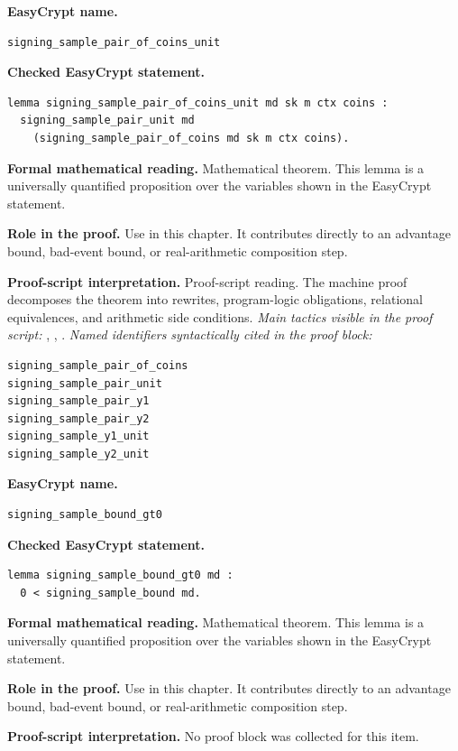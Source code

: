 \begin{formaltheorem}
\noindent\textbf{EasyCrypt name.}
\begin{lstlisting}[language=EasyCrypt,basicstyle=\ttfamily\scriptsize]
signing_sample_pair_of_coins_unit
\end{lstlisting}
\noindent\textbf{Checked EasyCrypt statement.}
\begin{lstlisting}[language=EasyCrypt,basicstyle=\ttfamily\scriptsize]
lemma signing_sample_pair_of_coins_unit md sk m ctx coins :
  signing_sample_pair_unit md
    (signing_sample_pair_of_coins md sk m ctx coins).
\end{lstlisting}
\noindent\textbf{Formal mathematical reading.}
Mathematical theorem. This lemma is a universally quantified proposition over the variables shown in the EasyCrypt statement.

\noindent\textbf{Role in the proof.}
Use in this chapter. It contributes directly to an advantage bound, bad-event bound, or real-arithmetic composition step.

\noindent\textbf{Proof-script interpretation.}
Proof-script reading. The machine proof decomposes the theorem into rewrites, program-logic obligations, relational equivalences, and arithmetic side conditions.
\emph{Main tactics visible in the proof script:} , , .
\emph{Named identifiers syntactically cited in the proof block:}
\begin{lstlisting}[language=EasyCrypt,basicstyle=\ttfamily\scriptsize]
signing_sample_pair_of_coins
signing_sample_pair_unit
signing_sample_pair_y1
signing_sample_pair_y2
signing_sample_y1_unit
signing_sample_y2_unit
\end{lstlisting}

\end{formaltheorem}

\begin{formaltheorem}
\noindent\textbf{EasyCrypt name.}
\begin{lstlisting}[language=EasyCrypt,basicstyle=\ttfamily\scriptsize]
signing_sample_bound_gt0
\end{lstlisting}
\noindent\textbf{Checked EasyCrypt statement.}
\begin{lstlisting}[language=EasyCrypt,basicstyle=\ttfamily\scriptsize]
lemma signing_sample_bound_gt0 md :
  0 < signing_sample_bound md.
\end{lstlisting}
\noindent\textbf{Formal mathematical reading.}
Mathematical theorem. This lemma is a universally quantified proposition over the variables shown in the EasyCrypt statement.

\noindent\textbf{Role in the proof.}
Use in this chapter. It contributes directly to an advantage bound, bad-event bound, or real-arithmetic composition step.

\noindent\textbf{Proof-script interpretation.}
No proof block was collected for this item.

\end{formaltheorem}

